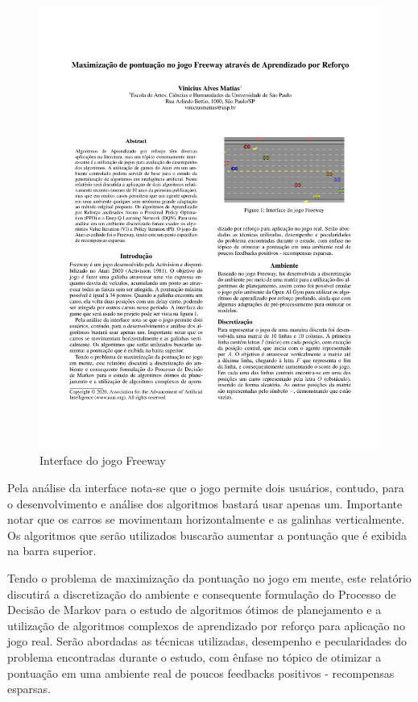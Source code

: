 \documentclass[letterpaper]{article} %
\begin{document}
\begin{figure}[h]
\centering
\includegraphics[width=0.9\columnwidth]{freeway}
\caption{Interface do jogo Freeway}
\label{freeway}
\end{figure}

Pela análise da interface nota-se que o jogo permite dois usuários, contudo, para o desenvolvimento e análise dos algoritmos bastará usar apenas um. Importante notar que os carros se movimentam horizontalmente e as galinhas verticalmente. Os algoritmos que serão utilizados buscarão aumentar a pontuação que é exibida na barra superior.

Tendo o problema de maximização da pontuação no jogo em mente, este relatório discutirá a discretização do ambiente e consequente formulação do Processo de Decisão de Markov para o estudo de algoritmos ótimos de planejamento e a utilização de algoritmos complexos de aprendizado por reforço para aplicação no jogo real. Serão abordadas as técnicas utilizadas, desempenho e pecularidades do problema encontradas durante o estudo, com ênfase no tópico de otimizar a pontuação em uma ambiente real de poucos feedbacks positivos - recompensas esparsas.
\end{document}

